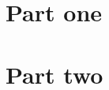 \documentclass[10pt,a4paper]{article}
\begin{document}
\section{Part one}\lipsum[1-7]
\limenrestart
\section{Part two}\lipsum[8-14]
\end{document}
